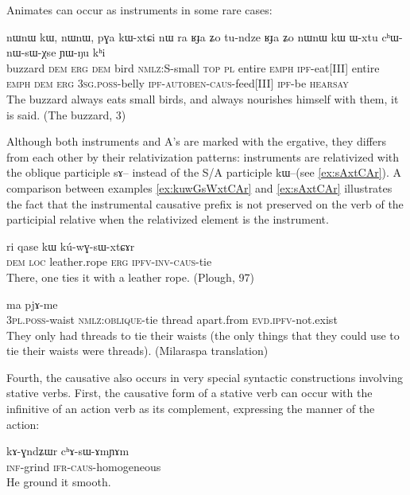 \documentclass[oldfontcommands,oneside,a4paper,11pt]{article}
\newcommand{\ipa}[1]{{\phon \mbox{#1}}} %
\newcommand{\sg}{\textsc{sg}}
\newcommand{\pl}{\textsc{pl}}
\newcommand{\auto}{\textsc{autoben}}
\newcommand{\caus}{\textsc{caus}}
\newcommand{\dem}{\textsc{dem}}
\newcommand{\erg}{\textsc{erg}}
\newcommand{\emphat}{\textsc{emph}}
\newcommand{\evd}{\textsc{ifr}}
\newcommand{\inftv}{\textsc{inf}}
\newcommand{\ipf}{\textsc{ipf}}
\newcommand{\nmlz}{\textsc{nmlz}}
\newcommand{\poss}{\textsc{poss}}
\newcommand{\topic}{\textsc{top}}
\begin{document}
 
 Animates can occur as instruments in some rare cases:
 
\begin{exe}
\ex
\gll  \ipa{βʑar} 	\ipa{nɯnɯ} 	\ipa{kɯ,} 	\ipa{nɯnɯ,} 	\ipa{pɣa} 	\ipa{kɯ-xtɕi} 	\ipa{nɯ} 	\ipa{ra} 	\ipa{ʁɟa} 	\ipa{ʑo} 	\ipa{tu-ndze} 	\ipa{ʁɟa} 	\ipa{ʑo} 	\ipa{nɯnɯ} 	\ipa{kɯ} 	\ipa{ɯ-xtu} 	\ipa{cʰɯ-nɯ-sɯ-χse} 	\ipa{ɲɯ-ŋu} 	\ipa{kʰi}  \\
 buzzard \dem{} \erg{} \dem{} bird \nmlz{}:S-small \topic{} \pl{} entire \emphat{} \ipf{}-eat[III] entire \emphat{} \dem{} \erg{} 3\sg{}.\poss{}-belly \ipf{}-\auto{}-\caus{}-feed[III] \ipf{}-be \textsc{hearsay} \\
\glt  The buzzard always eats small birds, and always nourishes himself with them, it is said. (The buzzard, 3)
\end{exe} 

Although both instruments and A's are marked with the ergative, they differs from each other by their relativization patterns: instruments are relativized with the oblique participle \ipa{sɤ--} instead of the S/A participle \ipa{kɯ--}(see \ref{ex:sAxtCAr}). A comparison between examples \ref{ex:kuwGsWxtCAr}  and \ref{ex:sAxtCAr} illustrates the fact that the instrumental causative prefix is not preserved on the verb of the participial relative when the relativized element is the instrument. 

 \begin{exe}
  \ex   \label{ex:kuwGsWxtCAr}  
\gll \ipa{ɯnɯnɯ}  	\ipa{ri}  	\ipa{qase}  	\ipa{kɯ}  	\ipa{kú-wɣ-sɯ-xtɕɤr}  \\
\textsc{dem} \textsc{loc} leather.rope \textsc{erg} \textsc{ipfv-inv-caus}-tie \\
\glt There, one ties it with a leather rope. (Plough, 97)
   \end{exe} 



 \begin{exe}
  \ex  \label{ex:sAxtCAr}  
  \gll [\ipa{nɯ-mtʰɤɣ}  	\ipa{sɤ-xtɕɤr}]  	\ipa{xɕɤfsa}  	\ipa{ma}  	\ipa{pjɤ-me}  \\
\textsc{3pl.poss}-waist \textsc{nmlz:oblique}-tie thread apart.from \textsc{evd.ipfv}-not.exist \\
\glt They only had threads to tie their waists (the only things that they could use to tie their waists were threads). (Milaraspa translation)
   \end{exe} 

Fourth, the causative also occurs in very special syntactic constructions involving stative verbs. First, the causative form of a stative verb can occur with the infinitive of an action verb as its complement, expressing the manner of the action:
\begin{exe}
\ex
\gll 
 \ipa{kɤ-ɣndʑɯr} 	\ipa{cʰɤ-sɯ-ɤmɲɤm}  \\
 \inftv{}-grind \evd{}-\caus{}-homogeneous \\
 \glt  He ground it smooth.
\end{exe} 
\end{document}
